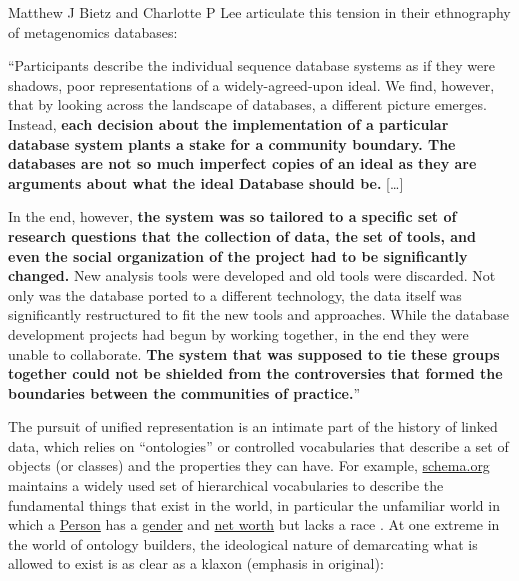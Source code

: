 Matthew J Bietz and Charlotte P Lee articulate this tension in their
ethnography of metagenomics databases:

\begin{leftbar}
``Participants describe the individual sequence database systems as if
they were shadows, poor representations of a widely-agreed-upon ideal.
We find, however, that by looking across the landscape of databases, a
different picture emerges. Instead, \textbf{each decision about the
implementation of a particular database system plants a stake for a
community boundary. The databases are not so much imperfect copies of an
ideal as they are arguments about what the ideal Database should be.}
{[}\ldots{]}

In the end, however, \textbf{the system was so tailored to a specific
set of research questions that the collection of data, the set of tools,
and even the social organization of the project had to be significantly
changed.} New analysis tools were developed and old tools were
discarded. Not only was the database ported to a different technology,
the data itself was significantly restructured to fit the new tools and
approaches. While the database development projects had begun by working
together, in the end they were unable to collaborate. \textbf{The system
that was supposed to tie these groups together could not be shielded
from the controversies that formed the boundaries between the
communities of practice.}'' \citep{bietzCollaborationMetagenomicsSequence2009} 
\end{leftbar}

The pursuit of unified representation is an intimate part of the history
of linked data, which relies on ``ontologies'' or controlled
vocabularies that describe a set of objects (or classes) and the
properties they can have. For example,
\href{https://schema.org}{schema.org} maintains a widely used set of
hierarchical vocabularies to describe the fundamental things that exist
in the world, in particular the unfamiliar world in which a
\href{https://schema.org/Person}{Person} has a
\href{https://schema.org/gender}{gender} and
\href{https://schema.org/netWorth}{net worth} but lacks a race \citep{poirierTurnScruffyEthnographic2017} . At one extreme in the world of
ontology builders, the ideological nature of demarcating what is allowed
to exist is as clear as a klaxon (emphasis in original):

